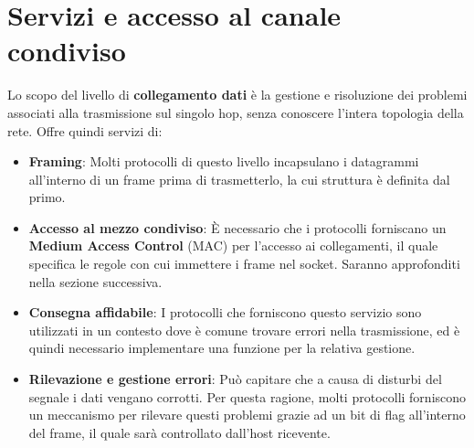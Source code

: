 \section{Servizi e accesso al canale condiviso}
Lo scopo del livello di \textbf{collegamento dati} è la gestione e risoluzione dei problemi associati alla trasmissione sul singolo hop, senza
conoscere l'intera topologia della rete. Offre quindi servizi di: \begin{itemize}
    \item \textbf{Framing}: Molti protocolli di questo livello incapsulano i datagrammi all'interno di un frame prima di trasmetterlo, la cui struttura
    è definita dal primo.
    \item \textbf{Accesso al mezzo condiviso}: È necessario che i protocolli forniscano un \textbf{Medium Access Control} (MAC) per l'accesso ai
    collegamenti, il quale specifica le regole con cui immettere i frame nel socket. Saranno approfonditi nella sezione successiva.
    \item \textbf{Consegna affidabile}: I protocolli che forniscono questo servizio sono utilizzati in un contesto dove è comune trovare errori nella
    trasmissione, ed è quindi necessario implementare una funzione per la relativa gestione.
    \item \textbf{Rilevazione e gestione errori}: Può capitare che a causa di disturbi del segnale i dati vengano corrotti. Per questa ragione, molti
    protocolli forniscono un meccanismo per rilevare questi problemi grazie ad un bit di flag all'interno del frame, il quale sarà controllato dall'host
    ricevente.
\end{itemize}

